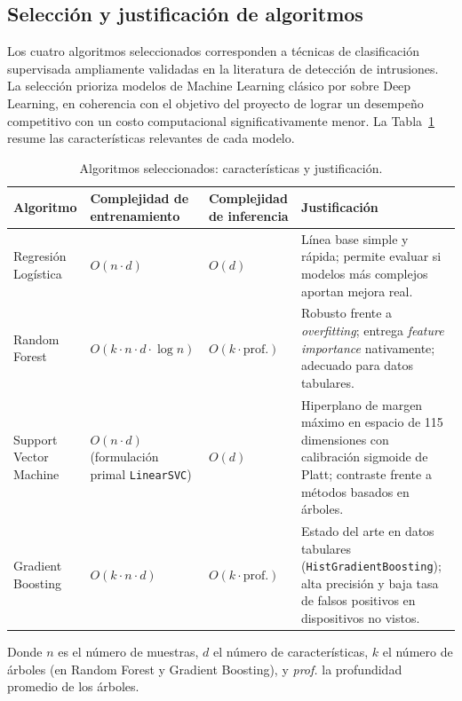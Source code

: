 \documentclass[11pt,a4paper]{article}
\begin{document}
\subsection{Selección y justificación de algoritmos}
Los cuatro algoritmos seleccionados corresponden a técnicas de clasificación supervisada ampliamente validadas en la literatura de detección de intrusiones. La selección prioriza modelos de Machine Learning clásico por sobre Deep Learning, en coherencia con el objetivo del proyecto de lograr un desempeño competitivo con un costo computacional significativamente menor. La Tabla~\ref{tab:algoritmos} resume las características relevantes de cada modelo.

\begin{table}[H]
\centering
\caption{Algoritmos seleccionados: características y justificación.}
\label{tab:algoritmos}
\small
\begin{tabularx}{\textwidth}{p{2.5cm} p{2.5cm} p{2.8cm} X}
\toprule
\textbf{Algoritmo} & \textbf{Complejidad de entrenamiento} & \textbf{Complejidad de inferencia} & \textbf{Justificación} \\
\midrule
Regresión Logística & $O(n \cdot d)$ & $O(d)$ & Línea base simple y rápida; permite evaluar si modelos más complejos aportan mejora real. \\
Random Forest & $O(k \cdot n \cdot d \cdot \log n)$ & $O(k \cdot \text{prof.})$ & Robusto frente a \textit{overfitting}; entrega \textit{feature importance} nativamente; adecuado para datos tabulares. \\
Support Vector Machine & $O(n \cdot d)$ (formulación primal \texttt{LinearSVC}) & $O(d)$ & Hiperplano de margen máximo en espacio de 115 dimensiones con calibración sigmoide de Platt; contraste frente a métodos basados en árboles. \\
Gradient Boosting & $O(k \cdot n \cdot d)$ & $O(k \cdot \text{prof.})$ & Estado del arte en datos tabulares (\texttt{HistGradientBoosting}); alta precisión y baja tasa de falsos positivos en dispositivos no vistos. \\
\bottomrule
\end{tabularx}
\end{table}

\noindent Donde $n$ es el número de muestras, $d$ el número de características, $k$ el número de árboles (en Random Forest y Gradient Boosting), y \textit{prof.} la profundidad promedio de los árboles.
\end{document}
